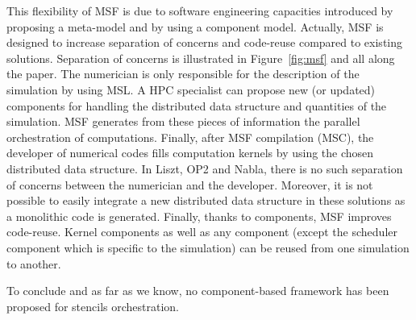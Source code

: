 This flexibility of MSF is due to software engineering capacities introduced by proposing a meta-model and by using a component model. Actually, MSF is designed to increase separation of concerns and code-reuse compared to existing solutions.
Separation of concerns is illustrated in Figure~\ref{fig:msf} and all along the paper. The numerician is only responsible for the description of the simulation by using MSL. A HPC specialist can propose new (or updated) components for handling the distributed data structure and quantities of the simulation. MSF generates from these pieces of information the parallel orchestration of computations. Finally, after MSF compilation (MSC), the developer of numerical codes fills computation kernels by using the chosen distributed data structure. In Liszt, OP2 and Nabla, there is no such separation of concerns between the numerician and the developer. 
Moreover, it is not possible to easily integrate a new distributed data structure in these solutions as a monolithic code is generated.
Finally, thanks to components, MSF improves code-reuse. Kernel components as well as any component (except the scheduler component which is specific to the simulation) can be reused from one simulation to another.

To conclude and as far as we know, no component-based framework has been proposed for stencils orchestration.
